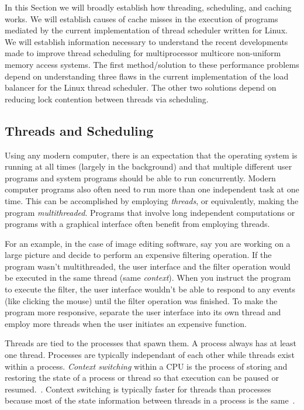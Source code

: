 \documentclass{sig-alternate}
\begin{document}
In this Section we will broadly establish how threading, scheduling, and caching works. We will establish causes of cache misses in the execution of programs mediated by the current implementation of thread scheduler written for Linux. We will establish information necessary to understand the recent developments made to improve thread scheduling for multiprocessor multicore non-uniform memory access systems. The first method/solution to these performance problems depend on understanding three flaws in the current implementation of the load balancer for the Linux thread scheduler. The other two solutions depend on reducing lock contention between threads via scheduling.

\subsection{Threads and Scheduling}
\label{sec:threads}
Using any modern computer, there is an expectation that the operating system is running at all times (largely in the background) and that multiple different user programs and system programs should be able to run concurrently. Modern computer programs also often need to run more than one independent task at one time. This can be accomplished by employing \emph{threads}, or equivalently, making the program \emph{multithreaded}. Programs that involve long independent computations or programs with a graphical interface often benefit from employing threads.

For an example, in the case of image editing software, say you are working on a large picture and decide to perform an expensive filtering operation. If the program wasn't multithreaded, the user interface and the filter operation would be executed in the same thread (same \emph{context}). When you instruct the program to execute the filter, the user interface wouldn't be able to respond to any events (like clicking the mouse) until the filter operation was finished. To make the program more responsive, separate the user interface into its own thread and employ more threads when the user initiates an expensive function.
	
Threads are tied to the processes that spawn them. A process always has at least one thread. Processes are typically independant of each other while threads exist within a process. \emph{Context switching} within a CPU is the process of storing and restoring the state of a process or thread so that execution can be paused or resumed.~\cite{WikiContext}. Context switching is typically faster for threads than processes because most of the state information between threads in a process is the same~\cite{WikiThreads}. 
\end{document}
